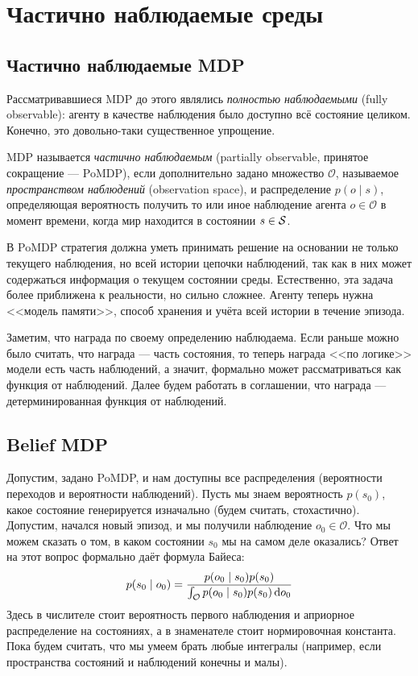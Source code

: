 \section{Частично наблюдаемые среды}\label{sec:PoMDP}

\subsection{Частично наблюдаемые MDP}

Рассматривавшиеся MDP до этого являлись \emph{полностью наблюдаемыми} (fully observable): агенту в качестве наблюдения было доступно всё состояние целиком. Конечно, это довольно-таки существенное упрощение.

\begin{definition}
MDP называется \emph{частично наблюдаемым} (partially observable, принятое сокращение --- PoMDP), если дополнительно задано множество $\mathcal{O}$, называемое \emph{пространством наблюдений} (observation space), и распределение $p(o \mid s)$, определяющая вероятность получить то или иное наблюдение агента $o \in \mathcal{O}$ в момент времени, когда мир находится в состоянии $s \in \mathcal{S}$.
\end{definition}

В PoMDP стратегия должна уметь принимать решение на основании не только текущего наблюдения, но всей истории цепочки наблюдений, так как в них может содержаться информация о текущем состоянии среды. Естественно, эта задача более приближена к реальности, но сильно сложнее. Агенту теперь нужна <<модель памяти>>, способ хранения и учёта всей истории в течение эпизода.

Заметим, что награда по своему определению наблюдаема. Если раньше можно было считать, что награда --- часть состояния, то теперь награда <<по логике>> модели есть часть наблюдений, а значит, формально может рассматриваться как функция от наблюдений. Далее будем работать в соглашении, что награда --- детерминированная функция от наблюдений.

\subsection{Belief MDP}

Допустим, задано PoMDP, и нам доступны все распределения (вероятности переходов и вероятности наблюдений). Пусть мы знаем вероятность $p(s_0)$, какое состояние генерируется изначально (будем считать, стохастично). Допустим, начался новый эпизод, и мы получили наблюдение $o_0 \in \mathcal{O}$. Что мы можем сказать о том, в каком состоянии $s_0$ мы на самом деле оказались? Ответ на этот вопрос формально даёт формула Байеса:
\begin{equation}\label{initial_belief}
p(s_0 \mid o_0) = \frac{p(o_0 \mid s_0)p(s_0)}{\int_{\mathcal{O}} p(o_0 \mid s_0)p(s_0) \mathop{}\!\mathrm{d} o_0}
\end{equation}
Здесь в числителе стоит вероятность первого наблюдения и априорное распределение на состояниях, а в знаменателе стоит нормировочная константа. Пока будем считать, что мы умеем брать любые интегралы (например, если пространства состояний и наблюдений конечны и малы).

